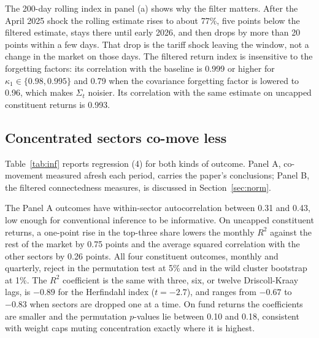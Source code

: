 \documentclass[11pt]{article}
\begin{document}
The 200-day rolling index in panel (a) shows why the filter matters. After the April 2025 shock the rolling estimate rises to about 77\%, five points below the filtered estimate, stays there until early 2026, and then drops by more than 20 points within a few days. That drop is the tariff shock leaving the window, not a change in the market on those days. The filtered return index is insensitive to the forgetting factors: its correlation with the baseline is 0.999 or higher for $\kappa_1\in\{0.98, 0.995\}$ and 0.79 when the covariance forgetting factor is lowered to 0.96, which makes $\Sigma_t$ noisier. Its correlation with the same estimate on uncapped constituent returns is 0.993.

\subsection{Concentrated sectors co-move less}\label{sec:conc}

Table~\ref{tab:inf} reports regression (4) for both kinds of outcome. Panel A, co-movement measured afresh each period, carries the paper's conclusions; Panel B, the filtered connectedness measures, is discussed in Section~\ref{sec:norm}.

The Panel A outcomes have within-sector autocorrelation between 0.31 and 0.43, low enough for conventional inference to be informative. On uncapped constituent returns, a one-point rise in the top-three share lowers the monthly $R^2$ against the rest of the market by 0.75 points and the average squared correlation with the other sectors by 0.26 points. All four constituent outcomes, monthly and quarterly, reject in the permutation test at 5\% and in the wild cluster bootstrap at 1\%. The $R^2$ coefficient is the same with three, six, or twelve Driscoll-Kraay lags, is $-0.89$ for the Herfindahl index ($t=-2.7$), and ranges from $-0.67$ to $-0.83$ when sectors are dropped one at a time. On fund returns the coefficients are smaller and the permutation $p$-values lie between 0.10 and 0.18, consistent with weight caps muting concentration exactly where it is highest.
\end{document}
